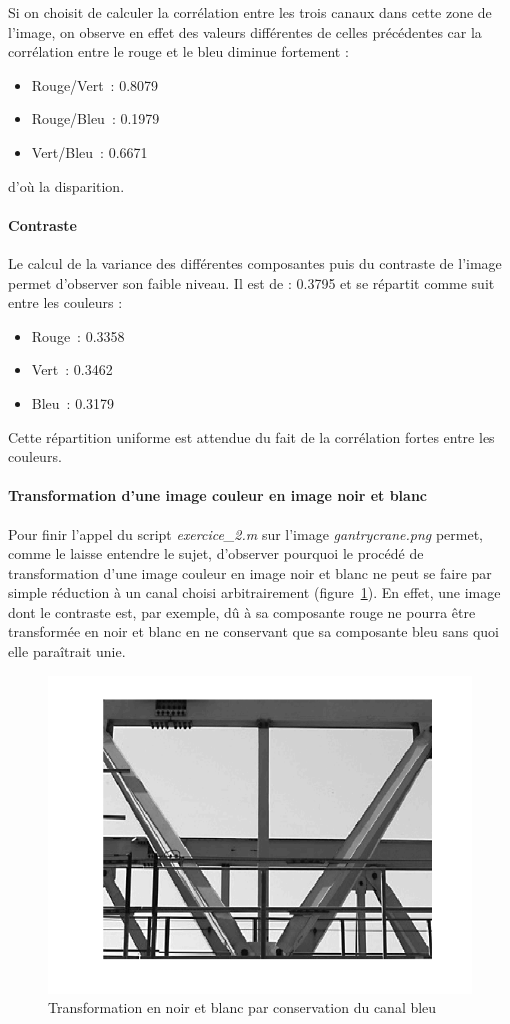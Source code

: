 \documentclass{article}
\begin{document}
Si on choisit de calculer la corrélation entre les trois canaux dans cette zone de l'image, on observe en effet des valeurs différentes de celles précédentes car la corrélation entre le rouge et le bleu diminue fortement :
\begin{itemize}
    \item Rouge/Vert~: 0.8079
    \item Rouge/Bleu~: 0.1979
    \item Vert/Bleu~: 0.6671
\end{itemize}

d'où la disparition.

\paragraph{Contraste}
Le calcul de la variance des différentes composantes puis du contraste de l'image permet d'observer son faible niveau. Il est de : 0.3795 et se répartit comme suit entre les couleurs :
\begin{itemize}
    \item Rouge~: 0.3358
    \item Vert~: 0.3462
    \item Bleu~: 0.3179
\end{itemize}
Cette répartition uniforme est attendue du fait de la corrélation fortes entre les couleurs.

\paragraph{Transformation d'une image couleur en image noir et blanc}
Pour finir l'appel du script \emph{exercice\_2.m} sur l'image \emph{gantrycrane.png} permet, comme le laisse entendre le sujet, d'observer pourquoi le procédé de transformation d'une image couleur en image noir et blanc ne peut se faire par simple réduction à un canal choisi arbitrairement (figure~\ref{transmission_canal_bleu}). En effet, une image dont le contraste est, par exemple, dû à sa composante rouge ne pourra être transformée en noir et blanc en ne conservant que sa composante bleu sans quoi elle paraîtrait unie.
\begin{figure}[ht]
    \begin{center}
        \includegraphics[width=0.6\linewidth]{images/1/1-1-gantrycrane_b.png}
        \caption{Transformation en noir et blanc par conservation du canal bleu}
        \label{transmission_canal_bleu}
    \end{center}
\end{figure}
\end{document}
